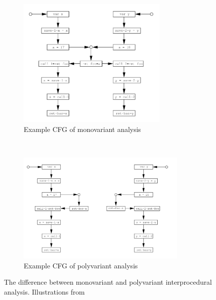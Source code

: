\begin{figure}[H]

  \begin{subfigure}[b]{\textwidth}
    \centering
    \includegraphics[width=0.8\textwidth]{figures/monovariant}
    \caption{Example CFG of monovariant analysis}
    \label{monovariant}
  \end{subfigure}
 ~ 
  \begin{subfigure}[b]{\textwidth}
    \centering
    \includegraphics[width=0.9\textwidth]{figures/polyvariant}
    \caption{Example CFG of polyvariant analysis}
    \label{polyvariant}
  \end{subfigure}
  
  \caption{The difference between monovariant and polyvariant interprocedural analysis. Illustrations from \citet[p.~40]{schwartzbach}}
  \label{monopoly}
\end{figure}

